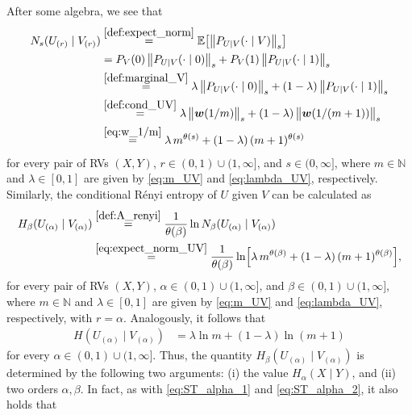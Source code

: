 \documentclass[conference, draftcls, onecolumn]{IEEEtran}
\theoremstyle{plain}
\newcommand{\bvec}[1]{\boldsymbol{#1}}
\begin{document}
After some algebra, we see that
\begin{align}
N_{s}(U_{(r)} \mid V_{(r)})
& \overset{\eqref{def:expect_norm}}{=}
\mathbb{E}\big[ \big\| P_{U|V}(\cdot \mid V) \big\|_{s} \big]
\\
& =
P_{V}( 0 ) \, \big\| P_{U|V}(\cdot \mid 0) \big\|_{s} + P_{V}( 1 ) \, \big\| P_{U|V}(\cdot \mid 1) \big\|_{s}
\\
& \overset{\eqref{def:marginal_V}}{=}
\lambda \, \big\| P_{U|V}(\cdot \mid 0) \big\|_{s} + (1-\lambda) \, \big\| P_{U|V}(\cdot \mid 1) \big\|_{s}
\\
& \overset{\eqref{def:cond_UV}}{=}
\lambda \, \big\| \bvec{w}(1/m) \big\|_{s} + (1-\lambda) \, \big\| \bvec{w}(1/(m+1)) \big\|_{s}
\\
& \overset{\eqref{eq:w_1/m}}{=}
\lambda \, m^{\theta( s )} + (1-\lambda) \, (m+1)^{\theta( s )}
\label{eq:expect_norm_UV}
\end{align}
for every pair of RVs $(X, Y)$, $r \in (0, 1) \cup (1, \infty]$, and $s \in (0, \infty]$, where $m \in \mathbb{N}$ and $\lambda \in [0, 1]$ are given by \eqref{eq:m_UV} and \eqref{eq:lambda_UV}, respectively.
Similarly, the conditional R\'{e}nyi entropy of $U$ given $V$ can be calculated as
\begin{align}
H_{\beta}(U_{(\alpha)} \mid V_{(\alpha)})
& \overset{\eqref{def:A_renyi}}{=}
\frac{ 1 }{ \theta( \beta ) } \ln N_{\beta}(U_{(\alpha)} \mid V_{(\alpha)})
\\
& \overset{\eqref{eq:expect_norm_UV}}{=}
\frac{ 1 }{ \theta( \beta ) } \ln \! \Big[ \lambda \, m^{\theta( \beta )} + (1-\lambda) \, (m+1)^{\theta( \beta )} \Big] ,
\label{eq:renyi_UV}
\end{align}
for every pair of RVs $(X, Y)$, $\alpha \in (0, 1) \cup (1, \infty]$, and $\beta \in (0, 1) \cup (1, \infty]$, where $m \in \mathbb{N}$ and $\lambda \in [0, 1]$ are given by \eqref{eq:m_UV} and \eqref{eq:lambda_UV}, respectively, with $r = \alpha$.
Analogously, it follows that
\begin{align}
H(U_{(\alpha)} \mid V_{(\alpha)})
& =
\lambda \ln m + (1 - \lambda) \ln (m + 1)
\label{eq:renyi_UV_1}
\end{align}
for every $\alpha \in (0, 1) \cup (1, \infty]$.
Thus, the quantity $H_{\beta}(U_{(\alpha)} \mid V_{(\alpha)})$ is determined by the following two arguments: (i) the value $H_{\alpha}(X \mid Y)$, and (ii) two orders $\alpha, \beta$.
In fact, as with \eqref{eq:ST_alpha_1} and \eqref{eq:ST_alpha_2}, it also holds that
\end{document}
